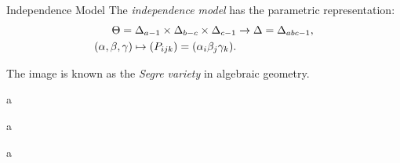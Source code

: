 \begin{frame}{Independence Model}
    The \emph{independence model} has the parametric representation:
    \begin{equation*}
        \begin{split}
            \Theta = \Delta_{a-1} \times \Delta_{b-c} \times \Delta_{c-1} &\rightarrow \Delta = \Delta_{abc - 1}, \\
            (\alpha,\beta,\gamma) \mapsto (P_{ijk}) = (\alpha_{i}\beta_{j}\gamma_{k}).
        \end{split}
    \end{equation*}

    The image is known as the \emph{Segre variety} in algebraic geometry.

\end{frame}

\begin{frame}{a}

\end{frame}

\begin{frame}{a}

\end{frame}

\begin{frame}{a}

\end{frame}